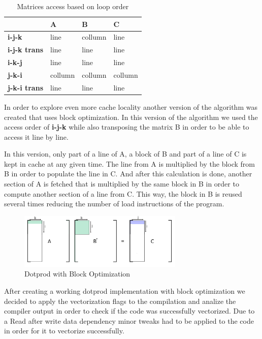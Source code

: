 \documentclass[a4paper]{report}
\begin{document}
\begin{table}[H]
\centering
\begin{tabular}{|l|l|l|l|}
\hline
                     & A       & B       & C       \\ \hline
\textbf{i-j-k}       & line    & collumn & line    \\ \hline
\textbf{i-j-k trans} & line    & line    & line    \\ \hline
\textbf{i-k-j}       & line    & line    & line    \\ \hline
\textbf{j-k-i}       & collumn & collumn & collumn \\ \hline
\textbf{j-k-i trans} & line    & line    & line    \\ \hline
\end{tabular}
\caption{Matrices access based on loop order}
\end{table}

In order to explore even more cache locality another version of the algorithm
was created that uses block optimization. In this version of the algorithm we
used the access order of \textbf{i-j-k} while also transposing the matrix B in
order to be able to access it line by line.

In this version, only part of a line of A, a block of B and part of a line of C
is kept in cache at any given time. The line from A is multiplied by the block
from B in order to populate the line in C. And after this calculation is done,
another section of A is fetched that is multiplied by the same block in B
in order to compute another section of a line from C. This way, the block in B
is reused several times reducing the number of load instructions of the program.

\begin{figure}[H]
    \centering
        \includegraphics[width=0.7\textwidth]{images/matrix_mult_block.png}
        \caption{Dotprod with Block Optimization}
\end{figure}

After creating a working dotprod implementation with block optimization we
decided to apply the vectorization flags to the compilation and analize the
compiler output in order to check if the code was successfully vectorized. Due
to a Read after write data dependency minor tweaks had to be applied to the code
in order for it to vectorize successfully.
\end{document}
